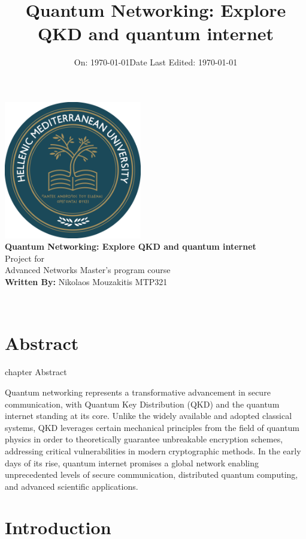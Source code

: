 \documentclass[12pt,a4paper] {report}
\title{\LARGE \textbf{Quantum Networking: Explore QKD and quantum internet}}
\author{}
\date{\large On: \today}
\begin{document}
\makeatletter
\begin{titlepage}
\centering
\vspace* {1cm}
{ \includegraphics[width=6cm]{ELMEPA.png}}\\[1cm]

{\LARGE \textbf{Quantum Networking: Explore QKD and quantum internet}}\\[1cm]
Project for\\[1cm]

	Advanced Networks Master's program course\\[0.5cm]



	\textbf{Written By:} {Nikolaos Mouzakitis MTP321}\\[1cm]
\date{\large Date Last Edited: \today}
{\@date\\}
\end{titlepage}
\makeatother


	\chapter* {Abstract}
	 {chapter} {Abstract}

		Quantum networking represents a transformative advancement in secure communication,
		with Quantum Key Distribution (QKD) and the quantum internet standing at its core.
		Unlike the widely available and adopted classical systems, QKD leverages certain mechanical principles
		from the field of quantum physics in order to theoretically guarantee unbreakable encryption schemes,
		addressing critical vulnerabilities in modern cryptographic methods.
		In the early days of its rise, quantum internet promises a global network enabling unprecedented levels of
		secure communication, distributed quantum computing, and advanced scientific applications.

\tableofcontents

        \chapter{Introduction}
\end{document}
